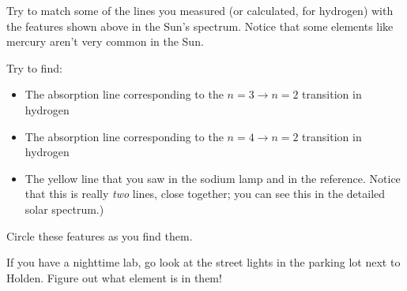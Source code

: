 \documentclass[11pt]{article}
\begin{document}
Try to match some of the lines you measured (or calculated, for hydrogen) with the features shown above
in the Sun's spectrum. Notice that some elements like mercury aren't very common in the Sun.

Try to find:

\begin{itemize}
\item The absorption line corresponding to the $n=3 \rightarrow n=2$ transition in hydrogen
\item The absorption line corresponding to the $n=4 \rightarrow n=2$ transition in hydrogen
\item The yellow line that you saw in the sodium lamp and in the reference. Notice that this is really
{\it two} lines, close together; you can see this in the detailed solar spectrum.)
\end{itemize}

Circle these features as you find them.

If you have a nighttime lab, go look at the street lights in the parking lot next to Holden. Figure out what element is in them!
\end{document}
